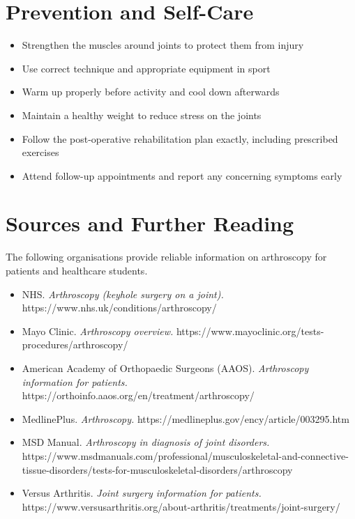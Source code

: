 \section*{Prevention and Self-Care}
\begin{itemize}
    \item Strengthen the muscles around joints to protect them from injury
    \item Use correct technique and appropriate equipment in sport
    \item Warm up properly before activity and cool down afterwards
    \item Maintain a healthy weight to reduce stress on the joints
    \item Follow the post-operative rehabilitation plan exactly, including prescribed exercises
    \item Attend follow-up appointments and report any concerning symptoms early
\end{itemize}

\section*{Sources and Further Reading}
The following organisations provide reliable information on arthroscopy for patients and healthcare students.

\begin{itemize}
    \item NHS. \textit{Arthroscopy (keyhole surgery on a joint).} https://www.nhs.uk/conditions/arthroscopy/
    \item Mayo Clinic. \textit{Arthroscopy overview.} https://www.mayoclinic.org/tests-procedures/arthroscopy/
    \item American Academy of Orthopaedic Surgeons (AAOS). \textit{Arthroscopy information for patients.} https://orthoinfo.aaos.org/en/treatment/arthroscopy/
    \item MedlinePlus. \textit{Arthroscopy.} https://medlineplus.gov/ency/article/003295.htm
    \item MSD Manual. \textit{Arthroscopy in diagnosis of joint disorders.} https://www.msdmanuals.com/professional/musculoskeletal-and-connective-tissue-disorders/tests-for-musculoskeletal-disorders/arthroscopy
    \item Versus Arthritis. \textit{Joint surgery information for patients.} https://www.versusarthritis.org/about-arthritis/treatments/joint-surgery/
\end{itemize}
